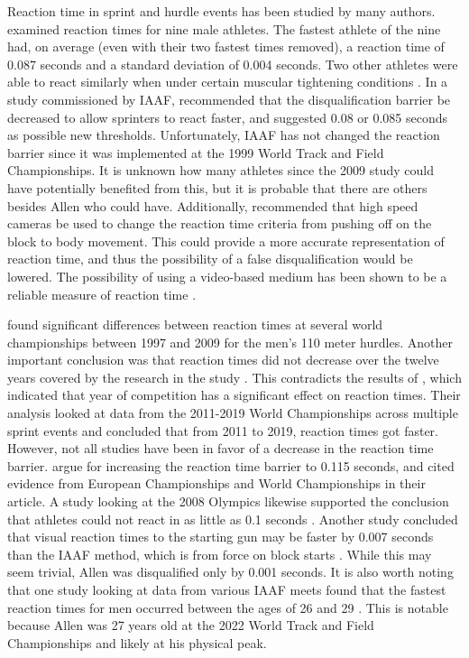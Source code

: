 \documentclass[12pt, letterpaper, titlepage]{article}
\begin{document}
Reaction time in sprint and hurdle events has been studied by many authors.
\citet{pain2007sprint} examined reaction times for nine male athletes. The
fastest athlete of the nine had, on average (even with their two fastest times 
removed), a reaction time of 0.087 seconds and a standard deviation of 0.004
seconds. Two other athletes were able to react similarly when under certain
muscular tightening conditions \citep{pain2007sprint}. 
In a study commissioned by IAAF,
\citet{komi2009iaaf} recommended that the disqualification 
barrier be decreased to allow sprinters to
react faster, and suggested 0.08 or 0.085 seconds as possible new thresholds.
Unfortunately, IAAF has not changed the reaction barrier since it was
implemented at the 1999 World Track and Field Championships.
It is unknown how many athletes since the 2009 study could have potentially
benefited from this, but it is probable that there are others besides Allen who
could have. Additionally,
\citet{komi2009iaaf} recommended that high speed cameras be used to
change the reaction time criteria from pushing off on the block to body
movement. This could provide a more accurate representation of reaction time, 
and thus the possibility of a false disqualification would be lowered.
The possibility of using a video-based medium has been shown to be a reliable
measure of reaction time \citep{mudric2015evaluation}.


\citet{pilianidis2012start} found
significant differences between reaction times at several world championships
between 1997 and 2009 for the men's 110 meter hurdles. Another important
conclusion was that reaction times did not decrease over the twelve years
covered by the research in the study \citep{pilianidis2012start}. This 
contradicts the results of \citet{zhang2021correlation}, which indicated that 
year of competition has a significant effect on reaction times. Their
analysis looked at data from the 2011-2019 World Championships across multiple
sprint events and concluded that from 2011 to 2019, reaction times got
faster. However, not all studies have been in favor of a decrease in the
reaction time barrier. \citet*{brosnan2017effects} argue for increasing 
the reaction time barrier to 0.115 seconds, and cited evidence from European 
Championships and World Championships in their article. A study looking 
at the 2008 Olympics likewise supported the conclusion that athletes could not
react in as little as 0.1 seconds \citep{lipps2011implications}. Another study
concluded that visual reaction times to the starting gun may be faster by 0.007
seconds than the IAAF method, which is from force on block starts 
\citep{holmes2018method}. While this may seem trivial, Allen was disqualified
only by 0.001 seconds. It is also worth noting that one study looking at data 
from various IAAF meets found that the fastest reaction times for men occurred 
between the ages of 26 and 29 \citep{tonnessen2013reaction}. This is notable 
because Allen was 27 years old at the 2022 World Track and Field Championships 
and likely at his physical peak.
\end{document}
